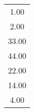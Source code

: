 \begin{tabular}{c}
      1.00\\
      2.00\\
     33.00\\
     44.00\\
     22.00\\
     14.00\\
      4.00
\end{tabular}
